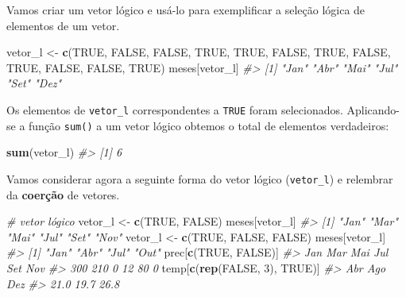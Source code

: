 \documentclass[]{book}
\newenvironment{Shaded}{\begin{snugshade}}{\end{snugshade}}
\newcommand{\KeywordTok}[1]{\textcolor[rgb]{0.13,0.29,0.53}{\textbf{#1}}}
\newcommand{\DecValTok}[1]{\textcolor[rgb]{0.00,0.00,0.81}{#1}}
\newcommand{\StringTok}[1]{\textcolor[rgb]{0.31,0.60,0.02}{#1}}
\newcommand{\CommentTok}[1]{\textcolor[rgb]{0.56,0.35,0.01}{\textit{#1}}}
\newcommand{\OtherTok}[1]{\textcolor[rgb]{0.56,0.35,0.01}{#1}}
\newcommand{\NormalTok}[1]{#1}
\begin{document}
Vamos criar um vetor lógico e usá-lo para exemplificar a seleção lógica
de elementos de um vetor.

\begin{Shaded}
\begin{Highlighting}[]
\NormalTok{vetor_l <-}\StringTok{ }\KeywordTok{c}\NormalTok{(}\OtherTok{TRUE}\NormalTok{, }\OtherTok{FALSE}\NormalTok{, }\OtherTok{FALSE}\NormalTok{, }\OtherTok{TRUE}\NormalTok{, }\OtherTok{TRUE}\NormalTok{, }\OtherTok{FALSE}\NormalTok{, }\OtherTok{TRUE}\NormalTok{, }\OtherTok{FALSE}\NormalTok{, }\OtherTok{TRUE}\NormalTok{, }\OtherTok{FALSE}\NormalTok{, }
    \OtherTok{FALSE}\NormalTok{, }\OtherTok{TRUE}\NormalTok{)}
\NormalTok{meses[vetor_l]}
\CommentTok{#> [1] "Jan" "Abr" "Mai" "Jul" "Set" "Dez"}
\end{Highlighting}
\end{Shaded}

Os elementos de \texttt{vetor\_l} correspondentes a \texttt{TRUE} foram
selecionados. Aplicando-se a função \texttt{sum()} a um vetor lógico
obtemos o total de elementos verdadeiros:

\begin{Shaded}
\begin{Highlighting}[]
\KeywordTok{sum}\NormalTok{(vetor_l)}
\CommentTok{#> [1] 6}
\end{Highlighting}
\end{Shaded}

Vamos considerar agora a seguinte forma do vetor lógico
(\texttt{vetor\_l}) e relembrar da \textbf{coerção} de vetores.

\begin{Shaded}
\begin{Highlighting}[]
\CommentTok{# vetor lógico}
\NormalTok{vetor_l <-}\StringTok{ }\KeywordTok{c}\NormalTok{(}\OtherTok{TRUE}\NormalTok{, }\OtherTok{FALSE}\NormalTok{)}
\NormalTok{meses[vetor_l]}
\CommentTok{#> [1] "Jan" "Mar" "Mai" "Jul" "Set" "Nov"}
\NormalTok{vetor_l <-}\StringTok{ }\KeywordTok{c}\NormalTok{(}\OtherTok{TRUE}\NormalTok{, }\OtherTok{FALSE}\NormalTok{, }\OtherTok{FALSE}\NormalTok{)}
\NormalTok{meses[vetor_l]}
\CommentTok{#> [1] "Jan" "Abr" "Jul" "Out"}
\NormalTok{prec[}\KeywordTok{c}\NormalTok{(}\OtherTok{TRUE}\NormalTok{, }\OtherTok{FALSE}\NormalTok{)]}
\CommentTok{#> Jan Mar Mai Jul Set Nov }
\CommentTok{#> 300 210   0  12  80   0}
\NormalTok{temp[}\KeywordTok{c}\NormalTok{(}\KeywordTok{rep}\NormalTok{(}\OtherTok{FALSE}\NormalTok{, }\DecValTok{3}\NormalTok{), }\OtherTok{TRUE}\NormalTok{)]}
\CommentTok{#>  Abr  Ago  Dez }
\CommentTok{#> 21.0 19.7 26.8}
\end{Highlighting}
\end{Shaded}
\end{document}
